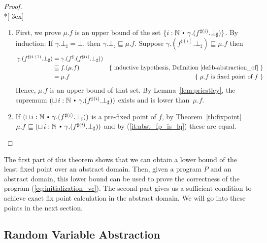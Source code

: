 \documentclass{eptcs}
\theoremstyle{plain}
\theoremstyle{definition}
\newcommand{\Nat}{\ensuremath{\mathbb N}}
\newcommand{\dotsep}{\mbox{\raisebox{0.4ex}{\tiny\ensuremath{\:\;\bullet\;\:}}}}
\newcommand{\slq}{\ensuremath{\sqsubseteq}}
\newcommand{\noi}[0]{\noindent}
\begin{document}
\begin{proof}\ \\*[-3ex]
  \begin{enumerate}

  \item
    First, we prove $\mu.f$ is an upper bound of the set \mbox{$\{i:\Nat \dotsep
      \gamma.(f^{\sharp(i)}.\bot_\sharp)\}$}. By induction: If $\gamma.\bot_\sharp =
    \bot$, then $\gamma.\bot_\sharp \slq \mu.f$\enspace. Suppose $\gamma.(f^{\sharp
      (i)}.\bot_\sharp) \slq \mu.f$ then
      \begin{align*}
        \gamma.(f^{\sharp (i+1)}.\bot_\sharp) 
            &= \gamma.(f^\sharp.(f^{\sharp (i)}.\bot_\sharp)) & \\
            &\slq f.(\mu.f) 
                 &\mbox{\{ inductive hypothesis, 
                           Definition \ref{def:b-abstraction_of} \}} \\
               &= \mu.f 
                 &\mbox{\{ $\mu.f$ is fixed point of $f$ \}}
      \end{align*}
    Hence, $\mu.f$ is an upper bound of that set.
    By Lemma~\ref{lem:priestley}, the
    supremum $(\sqcup \, i:\Nat \dotsep \gamma.(f^{\sharp (i)}.\bot_\sharp))$ exists and is lower
    than~$\mu.f$\enspace.


  \item 
    If $(\sqcup \, i:\Nat \dotsep \gamma.(f^{\sharp(i)}.\bot_\sharp))$ 
    is a \mbox{pre-fixed} point of $f$, by Theorem~\ref{th:fixpoint} $
    \mu.f
    \slq
    (\sqcup \, i:\Nat \dotsep \gamma.(f^{\sharp (i)}.\bot_\sharp))
    $
    and by (\ref{it:abst_fp_is_lq}) these are equal.
  \end{enumerate}
\end{proof}

\noi The first part of this theorem shows that we can obtain a lower bound of
the least fixed point over an abstract domain. Then, given a program $P$ and an
abstract domain, this lower bound can be used to prove the correctness of the program
(\ref{eq:initialization_vc}). The second part gives us a sufficient condition to
achieve exact fix point calculation in the abstract domain. We will go into
these points in the next section.

\subsection{Random Variable Abstraction}
\label{subsec:rva}
\end{document}
